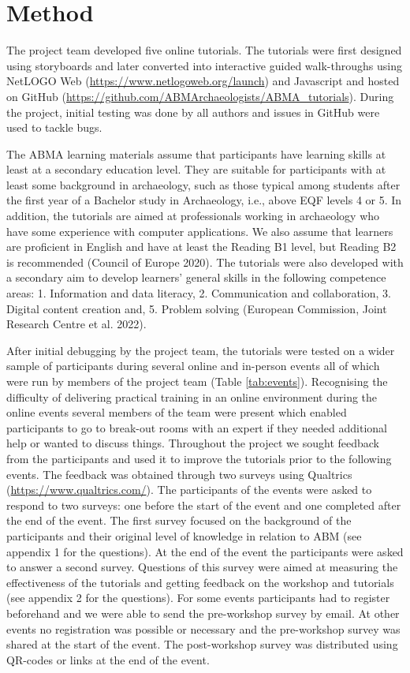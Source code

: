 \documentclass[
]{article}
\begin{document}
\hypertarget{method}{%
\section{Method}\label{method}}

The project team developed five online tutorials. The tutorials were first designed using storyboards and later converted into interactive guided walk-throughs using NetLOGO Web (\url{https://www.netlogoweb.org/launch}) and Javascript and hosted on GitHub (\url{https://github.com/ABMArchaeologists/ABMA_tutorials}). During the project, initial testing was done by all authors and issues in GitHub were used to tackle bugs.

The ABMA learning materials assume that participants have learning skills at least at a secondary education level. They are suitable for participants with at least some background in archaeology, such as those typical among students after the first year of a Bachelor study in Archaeology, i.e., above EQF levels 4 or 5. In addition, the tutorials are aimed at professionals working in archaeology who have some experience with computer applications. We also assume that learners are proficient in English and have at least the Reading B1 level, but Reading B2 is recommended (Council of Europe 2020). The tutorials were also developed with a secondary aim to develop learners' general skills in the following competence areas: 1. Information and data literacy, 2. Communication and collaboration, 3. Digital content creation and, 5. Problem solving (European Commission, Joint Research Centre et al. 2022).

After initial debugging by the project team, the tutorials were tested on a wider sample of participants during several online and in-person events all of which were run by members of the project team (Table \ref{tab:events}). Recognising the difficulty of delivering practical training in an online environment during the online events several members of the team were present which enabled participants to go to break-out rooms with an expert if they needed additional help or wanted to discuss things. Throughout the project we sought feedback from the participants and used it to improve the tutorials prior to the following events. The feedback was obtained through two surveys using Qualtrics (\url{https://www.qualtrics.com/}). The participants of the events were asked to respond to two surveys: one before the start of the event and one completed after the end of the event. The first survey focused on the background of the participants and their original level of knowledge in relation to ABM (see appendix 1 for the questions). At the end of the event the participants were asked to answer a second survey. Questions of this survey were aimed at measuring the effectiveness of the tutorials and getting feedback on the workshop and tutorials (see appendix 2 for the questions). For some events participants had to register beforehand and we were able to send the pre-workshop survey by email. At other events no registration was possible or necessary and the pre-workshop survey was shared at the start of the event. The post-workshop survey was distributed using QR-codes or links at the end of the event.
\end{document}
